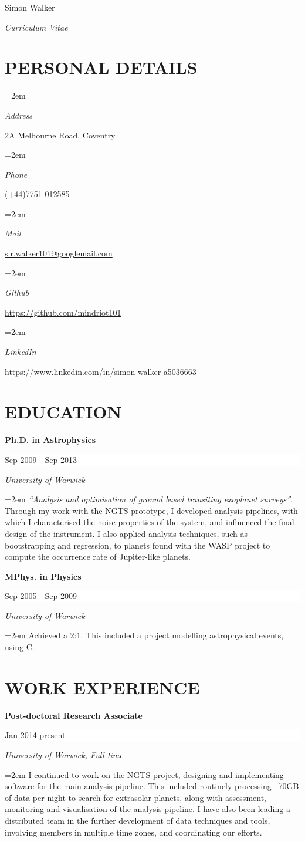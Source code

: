 \documentclass[paper=a4,fontsize=11pt]{scrartcl} %
\newlength{\spacebox}
\newcommand{\sepspace}{\vspace*{1em}}		%
\newcommand{\MyName}[1]{ %
		\Huge \usefont{OT1}{phv}{b}{n} \hfill #1
		\par \normalsize \normalfont}
\newcommand{\MySlogan}[1]{ %
		\large \usefont{OT1}{phv}{m}{n}\hfill \textit{#1}
		\par \normalsize \normalfont}
\newcommand{\NewPart}[1]{\section*{\uppercase{#1}}}
\newcommand{\PersonalEntry}[2]{
		\noindent\hangindent=2em\hangafter=0 %
		\parbox{\spacebox}{        %
		\textit{#1}}		       %
		\hspace{1.5em} #2 \par}    %
\newcommand{\EducationEntry}[4]{
		\noindent \textbf{#1} \hfill      %
		\colorbox{White}{%
			\parbox{10em}{%
			\hfill\color{Black}#2}} \par  %
		\noindent \textit{#3} \par        %
    \sepspace
		\noindent\hangindent=2em\hangafter=0 \small #4 %
		\normalsize \par}
\begin{document}

\MyName{Simon Walker}
\MySlogan{Curriculum Vitae}

\sepspace

\NewPart{Personal details}{}

\PersonalEntry{Address}{2A Melbourne Road, Coventry}
\PersonalEntry{Phone}{(+44)7751 012585}
\PersonalEntry{Mail}{\url{s.r.walker101@googlemail.com}}
\PersonalEntry{Github}{\url{https://github.com/mindriot101}}
\PersonalEntry{LinkedIn}{\url{https://www.linkedin.com/in/simon-walker-a5036663}}

\NewPart{Education}{}

\EducationEntry{Ph.D. in Astrophysics}{Sep 2009 - Sep 2013}{University of
  Warwick}{\textit{``Analysis and optimisation of ground based transiting
    exoplanet surveys''}. Through my work with the NGTS prototype, I developed
  analysis pipelines, with which I characterised the noise properties of the
  system, and influenced the final design of the instrument. I also applied
  analysis techniques, such as bootstrapping and regression, to planets found
  with the WASP project to compute the occurrence rate of Jupiter-like planets.}
\sepspace

\EducationEntry{MPhys. in Physics}{Sep 2005 - Sep 2009}{University of
  Warwick}{Achieved a 2:1. This included a project modelling astrophysical
  events, using C.}

\NewPart{Work experience}{}

\EducationEntry{Post-doctoral Research Associate}{Jan 2014-present}{University
  of Warwick, Full-time}{I continued to work on the NGTS project, designing and
  implementing software for the main analysis pipeline. This included routinely
  processing ~70GB of data per night to search for extrasolar planets, along
  with assessment, monitoring and visualisation of the analysis pipeline. I have
  also been leading a distributed team in the further development of data
  techniques and tools, involving members in multiple time zones, and
  coordinating our efforts.}
\end{document}
